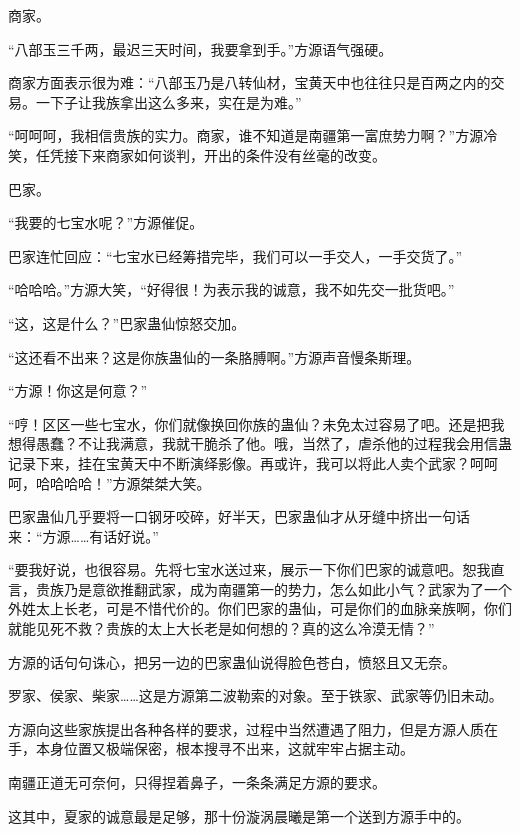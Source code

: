 
\begin{this_body}

商家。

“八部玉三千两，最迟三天时间，我要拿到手。”方源语气强硬。

商家方面表示很为难：“八部玉乃是八转仙材，宝黄天中也往往只是百两之内的交易。一下子让我族拿出这么多来，实在是为难。”

“呵呵呵，我相信贵族的实力。商家，谁不知道是南疆第一富庶势力啊？”方源冷笑，任凭接下来商家如何谈判，开出的条件没有丝毫的改变。

巴家。

“我要的七宝水呢？”方源催促。

巴家连忙回应：“七宝水已经筹措完毕，我们可以一手交人，一手交货了。”

“哈哈哈。”方源大笑，“好得很！为表示我的诚意，我不如先交一批货吧。”

“这，这是什么？”巴家蛊仙惊怒交加。

“这还看不出来？这是你族蛊仙的一条胳膊啊。”方源声音慢条斯理。

“方源！你这是何意？”

“哼！区区一些七宝水，你们就像换回你族的蛊仙？未免太过容易了吧。还是把我想得愚蠢？不让我满意，我就干脆杀了他。哦，当然了，虐杀他的过程我会用信蛊记录下来，挂在宝黄天中不断演绎影像。再或许，我可以将此人卖个武家？呵呵呵，哈哈哈哈！”方源桀桀大笑。

巴家蛊仙几乎要将一口钢牙咬碎，好半天，巴家蛊仙才从牙缝中挤出一句话来：“方源……有话好说。”

“要我好说，也很容易。先将七宝水送过来，展示一下你们巴家的诚意吧。恕我直言，贵族乃是意欲推翻武家，成为南疆第一的势力，怎么如此小气？武家为了一个外姓太上长老，可是不惜代价的。你们巴家的蛊仙，可是你们的血脉亲族啊，你们就能见死不救？贵族的太上大长老是如何想的？真的这么冷漠无情？”

方源的话句句诛心，把另一边的巴家蛊仙说得脸色苍白，愤怒且又无奈。

罗家、侯家、柴家……这是方源第二波勒索的对象。至于铁家、武家等仍旧未动。

方源向这些家族提出各种各样的要求，过程中当然遭遇了阻力，但是方源人质在手，本身位置又极端保密，根本搜寻不出来，这就牢牢占据主动。

南疆正道无可奈何，只得捏着鼻子，一条条满足方源的要求。

这其中，夏家的诚意最是足够，那十份漩涡晨曦是第一个送到方源手中的。


\end{this_body}
